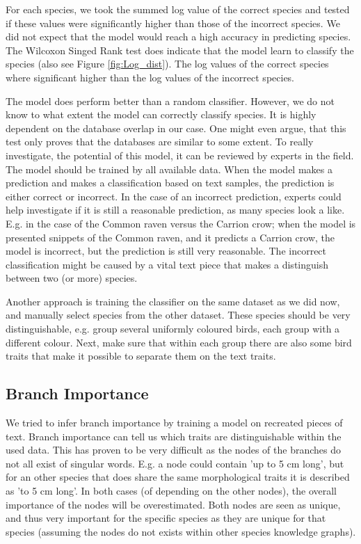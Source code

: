 \documentclass[a4paper, 12pt, oneside]{book} %
\begin{document}
For each species, we took the summed log value of the correct species and tested if these values were significantly higher than those of the incorrect species.
We did not expect that the model would reach a high accuracy in predicting species.
The Wilcoxon Singed Rank test does indicate that the model learn to classify the species (also see Figure \ref{fig:Log_dist}).
The log values of the correct species where significant higher than the log values of the incorrect species.

The model does perform better than a random classifier.
However, we do not know to what extent the model can correctly classify species.
It is highly dependent on the database overlap in our case.
One might even argue, that this test only proves that the databases are similar to some extent.
To really investigate, the potential of this model, it can be reviewed by experts in the field.
The model should be trained by all available data. 
When the model makes a prediction and makes a classification based on text samples, the prediction is either correct or incorrect.
In the case of an incorrect prediction, experts could help investigate if it is still a reasonable prediction, as many species look a like.
E.g. in the case of the Common raven versus the Carrion crow; when the model is presented snippets of the Common raven, and it predicts a Carrion crow, the model is incorrect, but the prediction is still very reasonable.
The incorrect classification might be caused by a vital text piece that makes a distinguish between two (or more) species.

Another approach is training the classifier on the same dataset as we did now, and manually select species from the other dataset.
These species should be very distinguishable, e.g. group several uniformly coloured birds, each group with a different colour.
Next, make sure that within each group there are also some bird traits that make it possible to separate them on the text traits.


\subsection{Branch Importance} \label{par:branch_importance}
We tried to infer branch importance by training a model on recreated pieces of text.
Branch importance can tell us which traits are distinguishable within the used data.
This has proven to be very difficult as the nodes of the branches do not all exist of singular words.
E.g. a node could contain 'up to 5 cm long', but for an other species that does share the same morphological traits it is described as 'to 5 cm long'.
In both cases (of depending on the other nodes), the overall importance of the nodes will be overestimated. 
Both nodes are seen as unique, and thus very important for the specific species as they are unique for that species (assuming the nodes do not exists within other species knowledge graphs).
\end{document}
